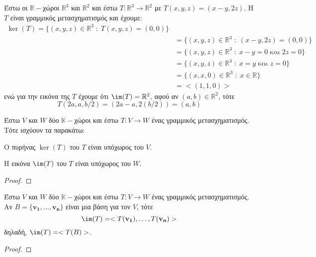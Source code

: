 \begin{example}
  Έστω οι $ \mathbb{R}- $χώροι $ \mathbb{R}^{3} $ και $ \mathbb{R}^{2} $ και έστω 
  $ T \colon \mathbb{R}^{3} \to \mathbb{R}^{2} $ με $ T(x,y,z) = (x-y,2z) $. Η 
  $T$ είναι γραμμικός μετασχηματισμός και έχουμε:
  \begin{align*}
    \ker(T) = \{(x,y,z)\in \mathbb{R}^{3} \; : \; T(x,y,z) = (0,0) \} \\
    &= \{(x,y,z)\in \mathbb{R}^{3} \; : \; (x-y,2z)=(0,0) \} \\
    &= \{(x,y,z)\in \mathbb{R}^{3} \; : \; x-y=0 \; \text{και} \; 2z=0 \} \\
    &= \{(x,y,z)\in \mathbb{R}^{3} \; : \; x=y \; \text{και} \; z=0 \} \\
    &= \{(x,x,0)\in \mathbb{R}^{3} \; : \; x \in \mathbb{R} \} \\
    &= < (1,1,0) >  
  \end{align*}
  ενώ για την εικόνα της $T$ έχουμε ότι $ \im(T) = \mathbb{R}^{2}  $, αφού αν 
  $ (a,b) \in \mathbb{R}^{2} $, τότε
  \[
    T(2a,a, b/2)= (2a-a,2(b/2)) = (a,b)
  \] 
\end{example}

\begin{thm}
  Έστω $V$ και $W$  δύο  $ \mathbb{K}- $χώροι  και έστω  $ T \colon V \to W $  ένας 
  γραμμικός μετασχηματισμός. Τότε ισχύουν τα παρακάτω:
  \begin{myitemize}
    \item Ο πυρήνας $ \ker(T)  $ του $T$ είναι υπόχωρος του $V$. 
    \item Η εικόνα $ \im(T)  $ του $T$ είναι υπόχωρος του $W$.
  \end{myitemize}
\end{thm}

\begin{proof}

\end{proof}

\begin{thm}
  Έστω $V$ και $W$ δύο $ \mathbb{K}- $χώροι και έστω $ T \colon V \to W $ ένας 
  γραμμικός μετασχηματισμός. Αν $ B = \{ \mathbf{v_{1}}, \ldots, \mathbf{v_{n}} \} $ 
  είναι μια βάση για τον $V$, τότε
  \[
    \im(T) = < T(\mathbf{v_{1}}), \ldots, T(\mathbf{v_{n}}) >  
  \]
  δηλαδή, $ \im(T) = < T(B) > $.
\end{thm}

\begin{proof}

\end{proof}

